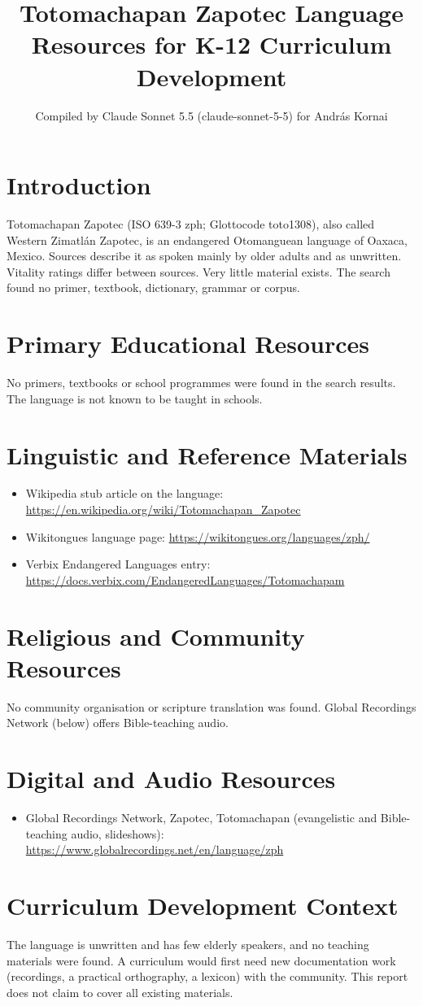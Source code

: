\documentclass[12pt]{article}
\title{Totomachapan Zapotec Language Resources for K-12 Curriculum Development}
\author{Compiled by Claude Sonnet 5.5 (claude-sonnet-5-5) for Andr\'as Kornai}
\date{}
\begin{document}
\maketitle

\section{Introduction}
Totomachapan Zapotec (ISO 639-3 zph; Glottocode toto1308), also called Western Zimatl\'an Zapotec, is an endangered Otomanguean language of Oaxaca, Mexico. Sources describe it as spoken mainly by older adults and as unwritten. Vitality ratings differ between sources. Very little material exists. The search found no primer, textbook, dictionary, grammar or corpus.

\section{Primary Educational Resources}
No primers, textbooks or school programmes were found in the search results. The language is not known to be taught in schools.

\section{Linguistic and Reference Materials}
\begin{itemize}
\item Wikipedia stub article on the language: \url{https://en.wikipedia.org/wiki/Totomachapan_Zapotec}
\item Wikitongues language page: \url{https://wikitongues.org/languages/zph/}
\item Verbix Endangered Languages entry: \url{https://docs.verbix.com/EndangeredLanguages/Totomachapam}
\end{itemize}

\section{Religious and Community Resources}
No community organisation or scripture translation was found. Global Recordings Network (below) offers Bible-teaching audio.

\section{Digital and Audio Resources}
\begin{itemize}
\item Global Recordings Network, Zapotec, Totomachapan (evangelistic and Bible-teaching audio, slideshows): \url{https://www.globalrecordings.net/en/language/zph}
\end{itemize}

\section{Curriculum Development Context}
The language is unwritten and has few elderly speakers, and no teaching materials were found. A curriculum would first need new documentation work (recordings, a practical orthography, a lexicon) with the community. This report does not claim to cover all existing materials.
\end{document}
